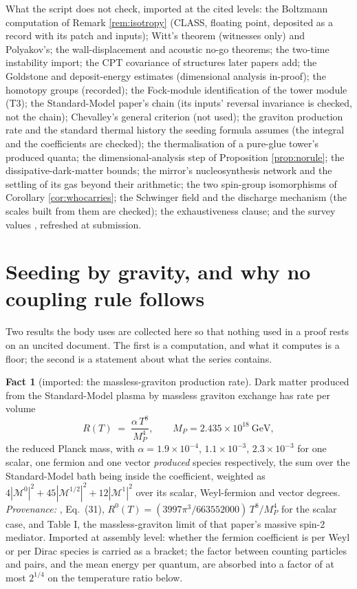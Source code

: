 \documentclass[11pt]{article}
\theoremstyle{definition}
\newtheorem{fact}[theorem]{Fact}
\let\oldsection\section
\renewcommand{\section}{\clearpage\oldsection}   %
\begin{document}
What the script does not check, imported at the cited levels: the Boltzmann computation of Remark \ref{rem:isotropy} (CLASS, floating point, deposited as a record with its patch and inputs); Witt's theorem (witnesses only) and Polyakov's; the wall-displacement and acoustic no-go theorems; the two-time instability import; the CPT covariance of structures later papers add; the Goldstone and deposit-energy estimates (dimensional analysis in-proof); the homotopy groups (recorded); the Fock-module identification of the tower module (T3); the Standard-Model paper's chain (its inputs' reversal invariance is checked, not the chain); Chevalley's general criterion (not used); the graviton production rate and the standard thermal history the seeding formula assumes (the integral and the coefficients are checked); the thermalisation of a pure-glue tower's produced quanta; the dimensional-analysis step of Proposition \ref{prop:norule}; the dissipative-dark-matter bounds; the mirror's nucleosynthesis network and the settling of its gas beyond their arithmetic; the two spin-group isomorphisms of Corollary \ref{cor:whocarries}; the Schwinger field and the discharge mechanism (the scales built from them are checked); the exhaustiveness clause; and the survey values \cite{Planck2018}, refreshed at submission.

\appendix
\section{Seeding by gravity, and why no coupling rule follows}\label{app:seeding}

Two results the body uses are collected here so that nothing used in a proof rests on an uncited document. The first is a computation, and what it computes is a floor; the second is a statement about what the series contains.

\begin{fact}[imported: the massless-graviton production rate]\label{fact:alpha}
Dark matter produced from the Standard-Model plasma by massless graviton exchange has rate per volume
\[
R(T) \;=\; \frac{\alpha\,T^{8}}{M_{P}^{4}}, \qquad M_{P} = 2.435 \times 10^{18}\ \mathrm{GeV},
\]
the reduced Planck mass, with $\alpha = 1.9 \times 10^{-4}$, $1.1 \times 10^{-3}$, $2.3 \times 10^{-3}$ for one scalar, one fermion and one vector \emph{produced} species respectively, the sum over the Standard-Model bath being inside the coefficient, weighted as $4|\mathcal{M}^{0}|^{2} + 45|\mathcal{M}^{1/2}|^{2} + 12|\mathcal{M}^{1}|^{2}$ over its scalar, Weyl-fermion and vector degrees. \emph{Provenance:} \cite{Bernal2018}, Eq.~(31), $R^{0}(T) = (3997\pi^{3}/663552000)\,T^{8}/M_{P}^{4}$ for the scalar case, and Table I, the massless-graviton limit of that paper's massive spin-2 mediator. Imported at assembly level: whether the fermion coefficient is per Weyl or per Dirac species is carried as a bracket; the factor between counting particles and pairs, and the mean energy per quantum, are absorbed into a factor of at most $2^{1/4}$ on the temperature ratio below.
\end{fact}
\end{document}
